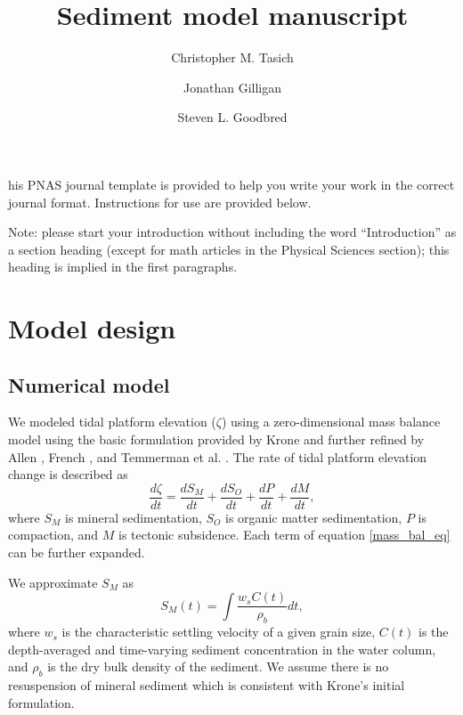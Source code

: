 \documentclass[9pt,twocolumn,twoside,lineno]{pnas-new}
\title{Sediment model manuscript}
\author[a,1]{Christopher M. Tasich}
\author[a,2]{Jonathan Gilligan}
\author[a,3]{Steven L. Goodbred}
\affil[a]{Vanderbilt University}
\begin{document}
\maketitle
\thispagestyle{firststyle}

his PNAS journal template is provided to help you write your work in the correct journal format. Instructions for use are provided below. 

Note: please start your introduction without including the word ``Introduction'' as a section heading (except for math articles in the Physical Sciences section); this heading is implied in the first paragraphs. 
\section*{Model design}

\subsection*{Numerical model}

We modeled tidal platform elevation ($\zeta$) using a zero-dimensional mass balance model using the basic formulation provided by Krone \cite{krone_method_1987} and further refined by Allen \cite{allen_salt-marsh_1990}, French \cite{french_numerical_1993}, and Temmerman et al. \cite{temmerman_modelling_2003,temmerman_modelling_2004}. The rate of tidal platform elevation change is described as
\begin{equation}\label{mass_bal_eq}
	\frac{d \zeta}{d t} = \frac{d S_M}{d t} + \frac{d S_O}{d t} + \frac{d P}{d t} + \frac{d M}{d t},
\end{equation}
where $S_M$ is mineral sedimentation, $S_O$ is organic matter sedimentation, $P$ is compaction, and $M$ is tectonic subsidence. Each term of equation \ref{mass_bal_eq} can be further expanded.

We approximate $S_M$ as
\begin{equation}\label{min_sed_eq}
	S_M(t) = \int{\frac{w_{s}C(t)}{\rho_b}dt},
\end{equation}
where $w_s$ is the characteristic settling velocity of a given grain size, $C(t)$ is the depth-averaged and time-varying sediment concentration in the water column, and $\rho_b$ is the dry bulk density of the sediment. We assume there is no resuspension of mineral sediment which is consistent with Krone's \cite{krone_method_1987} initial formulation.
\end{document}
